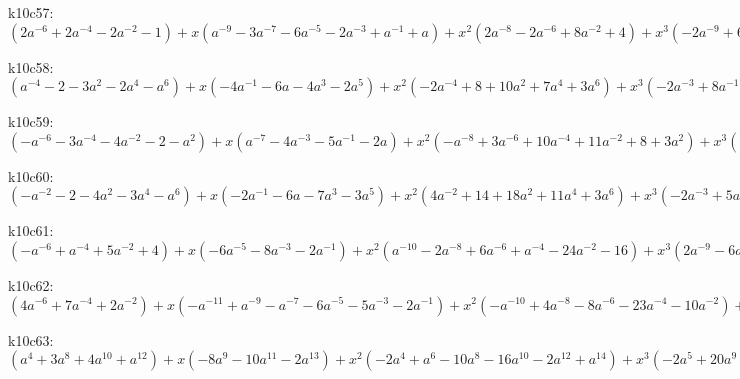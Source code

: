 k10c57: $ (2a^{-6}+2a^{-4}-2a^{-2}-1) +x(a^{-9}-3a^{-7}-6a^{-5}-2a^{-3}+a^{-1}+a) +x^{2}(2a^{-8}-2a^{-6}+8a^{-2}+4) +x^{3}(-2a^{-9}+6a^{-7}+18a^{-5}+12a^{-3}-2a) +x^{4}(-5a^{-8}-a^{-6}-a^{-4}-11a^{-2}-6) +x^{5}(a^{-9}-9a^{-7}-23a^{-5}-19a^{-3}-5a^{-1}+a) +x^{6}(3a^{-8}-3a^{-6}-7a^{-4}+2a^{-2}+3) +x^{7}(5a^{-7}+10a^{-5}+9a^{-3}+4a^{-1}) +x^{8}(4a^{-6}+7a^{-4}+3a^{-2}) +x^{9}(a^{-5}+a^{-3}) $

k10c58: $ (a^{-4}-2-3a^{2}-2a^{4}-a^{6}) +x(-4a^{-1}-6a-4a^{3}-2a^{5}) +x^{2}(-2a^{-4}+8+10a^{2}+7a^{4}+3a^{6}) +x^{3}(-2a^{-3}+8a^{-1}+21a+18a^{3}+7a^{5}) +x^{4}(a^{-4}-2a^{-2}-5-4a^{2}-5a^{4}-3a^{6}) +x^{5}(2a^{-3}-6a^{-1}-22a-23a^{3}-9a^{5}) +x^{6}(3a^{-2}-1-10a^{2}-5a^{4}+a^{6}) +x^{7}(4a^{-1}+7a+6a^{3}+3a^{5}) +x^{8}(3+6a^{2}+3a^{4}) +x^{9}(a+a^{3}) $

k10c59: $ (-a^{-6}-3a^{-4}-4a^{-2}-2-a^{2}) +x(a^{-7}-4a^{-3}-5a^{-1}-2a) +x^{2}(-a^{-8}+3a^{-6}+10a^{-4}+11a^{-2}+8+3a^{2}) +x^{3}(-3a^{-7}+4a^{-5}+20a^{-3}+21a^{-1}+8a) +x^{4}(a^{-8}-5a^{-6}-11a^{-4}-8a^{-2}-6-3a^{2}) +x^{5}(3a^{-7}-7a^{-5}-28a^{-3}-27a^{-1}-9a) +x^{6}(5a^{-6}+a^{-4}-9a^{-2}-4+a^{2}) +x^{7}(6a^{-5}+11a^{-3}+8a^{-1}+3a) +x^{8}(4a^{-4}+7a^{-2}+3) +x^{9}(a^{-3}+a^{-1}) $

k10c60: $ (-a^{-2}-2-4a^{2}-3a^{4}-a^{6}) +x(-2a^{-1}-6a-7a^{3}-3a^{5}) +x^{2}(4a^{-2}+14+18a^{2}+11a^{4}+3a^{6}) +x^{3}(-2a^{-3}+5a^{-1}+25a+27a^{3}+9a^{5}) +x^{4}(a^{-4}-9a^{-2}-22-17a^{2}-8a^{4}-3a^{6}) +x^{5}(4a^{-3}-11a^{-1}-38a-32a^{3}-9a^{5}) +x^{6}(8a^{-2}+5-7a^{2}-3a^{4}+a^{6}) +x^{7}(9a^{-1}+16a+10a^{3}+3a^{5}) +x^{8}(5+8a^{2}+3a^{4}) +x^{9}(a+a^{3}) $

k10c61: $ (-a^{-6}+a^{-4}+5a^{-2}+4) +x(-6a^{-5}-8a^{-3}-2a^{-1}) +x^{2}(a^{-10}-2a^{-8}+6a^{-6}+a^{-4}-24a^{-2}-16) +x^{3}(2a^{-9}-6a^{-7}+17a^{-5}+26a^{-3}+a^{-1}) +x^{4}(3a^{-8}-13a^{-6}+5a^{-4}+38a^{-2}+17) +x^{5}(4a^{-7}-18a^{-5}-16a^{-3}+6a^{-1}) +x^{6}(5a^{-6}-10a^{-4}-22a^{-2}-7) +x^{7}(5a^{-5}-5a^{-1}) +x^{8}(3a^{-4}+4a^{-2}+1) +x^{9}(a^{-3}+a^{-1}) $

k10c62: $ (4a^{-6}+7a^{-4}+2a^{-2}) +x(-a^{-11}+a^{-9}-a^{-7}-6a^{-5}-5a^{-3}-2a^{-1}) +x^{2}(-a^{-10}+4a^{-8}-8a^{-6}-23a^{-4}-10a^{-2}) +x^{3}(a^{-11}-2a^{-9}+5a^{-7}+16a^{-5}+15a^{-3}+7a^{-1}) +x^{4}(2a^{-10}-6a^{-8}+6a^{-6}+30a^{-4}+16a^{-2}) +x^{5}(3a^{-9}-8a^{-7}-15a^{-5}-9a^{-3}-5a^{-1}) +x^{6}(4a^{-8}-7a^{-6}-21a^{-4}-10a^{-2}) +x^{7}(4a^{-7}+2a^{-5}-a^{-3}+a^{-1}) +x^{8}(3a^{-6}+5a^{-4}+2a^{-2}) +x^{9}(a^{-5}+a^{-3}) $

k10c63: $ (a^{4}+3a^{8}+4a^{10}+a^{12}) +x(-8a^{9}-10a^{11}-2a^{13}) +x^{2}(-2a^{4}+a^{6}-10a^{8}-16a^{10}-2a^{12}+a^{14}) +x^{3}(-2a^{5}+20a^{9}+28a^{11}+10a^{13}) +x^{4}(a^{4}-3a^{6}+11a^{8}+24a^{10}+6a^{12}-3a^{14}) +x^{5}(2a^{5}-2a^{7}-16a^{9}-23a^{11}-11a^{13}) +x^{6}(3a^{6}-6a^{8}-19a^{10}-9a^{12}+a^{14}) +x^{7}(3a^{7}+4a^{9}+4a^{11}+3a^{13}) +x^{8}(3a^{8}+6a^{10}+3a^{12}) +x^{9}(a^{9}+a^{11}) $

